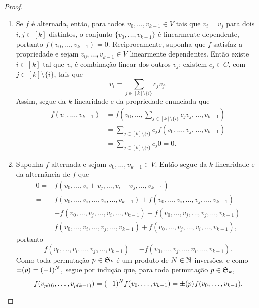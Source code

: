 \begin{proof}
	\begin{enumerate}
	\item Se $f$ é alternada, então, para todos $v_0,\ldots,v_{k-1} \in V$ tais que $v_i = v_j$ para dois $i,j \in [k]$ distintos, o conjunto $\{v_0,\ldots,v_{k-1}\}$ é linearmente dependente, portanto $f(v_0,\ldots,v_{k-1})=0$. Reciprocamente, suponha que $f$ satisfaz a propriedade e sejam $v_0,\ldots,v_{k-1} \in V$ linearmente dependentes. Então existe $i \in [k]$ tal que $v_i$ é combinação linear dos outros $v_j$: existem $c_j \in C$, com $j \in [k]\setminus\{i\}$, tais que
	\begin{equation*}
	v_i = \sum_{j \in [k]\setminus\{i\}} c_j v_j.
	\end{equation*}
Assim, segue da $k$-linearidade e da propriedade enunciada que
	\begin{align*}
	f(v_0,\ldots,v_{k-1}) &= f\left(v_0,\ldots, \sum_{j \in [k]\setminus\{i\}} c_j v_j,\ldots,v_{k-1}\right) \\
		&= \sum_{j \in [k]\setminus\{i\}} c_j f(v_0,\ldots,v_j,\ldots,v_{k-1}) \\
		&=\sum_{j \in [k]\setminus\{i\}} c_j 0 = 0.
	\end{align*}

	\item Suponha $f$ alternada e sejam $v_0,\ldots,v_{k-1} \in V$. Então segue da $k$-linearidade e da alternância de $f$ que
	\begin{align*}
	0 =&f(v_0,\ldots,v_i+v_j,\ldots,v_i+v_j,\ldots,v_{k-1}) \\
		=& f(v_0,\ldots,v_i,\ldots,v_i,\ldots,v_{k-1}) + f(v_0,\ldots,v_i,\ldots,v_j,\ldots,v_{k-1}) \\
		&+f(v_0,\ldots,v_j,\ldots,v_i,\ldots,v_{k-1}) + f(v_0,\ldots,v_j,\ldots,v_j,\ldots,v_{k-1}) \\
		=& f(v_0,\ldots,v_i,\ldots,v_j,\ldots,v_{k-1}) +f(v_0,\ldots,v_j,\ldots,v_i,\ldots,v_{k-1}),
	\end{align*}
portanto
	\begin{equation*}
	f(v_0,\ldots,v_i,\ldots,v_j,\ldots,v_{k-1}) = - f(v_0,\ldots,v_j,\ldots,v_i,\ldots,v_{k-1}).
	\end{equation*}
Como toda permutação $p \in \mathfrak{S}_k$ é um produto de $N \in \mathbb{N}$ inversões, e como $\mathord{\pm}(p)=(-1)^N$, segue por indução que, para toda permutação $p \in \mathfrak{S}_k$,
	\begin{equation*}
	f(v_{p(0)},\ldots,v_{p(k-1)}) =(-1)^N f(v_0,\ldots,v_{k-1}) = \mathord{\pm}(p) f(v_0,\ldots,v_{k-1}).
	\end{equation*}


\end{enumerate}
\end{proof}
